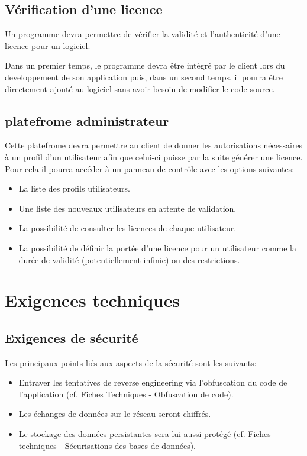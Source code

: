 \section{Vérification d'une licence}
Un programme devra permettre de vérifier la validité et l'authenticité d'une licence pour un logiciel. \newline

Dans un premier temps, le programme devra être intégré par le client lors du developpement de son application puis, dans un second temps, il pourra être directement ajouté au logiciel sans avoir besoin de modifier le code source.

\section{platefrome administrateur}
Cette platefrome devra permettre au client de donner les autorisations nécessaires à un profil d'un utilisateur afin que celui-ci puisse par la suite générer une licence.
Pour cela il pourra accéder à un panneau de contrôle avec les options suivantes:

\begin{itemize}
	\item La liste des profils utilisateurs.
	\item Une liste des nouveaux utilisateurs en attente de validation.
	\item La possibilité de consulter les licences de chaque utilisateur.
	\item La possibilité de définir la portée d'une licence pour un utilisateur comme la durée de validité (potentiellement infinie) ou des restrictions.
\end{itemize}
\newpage

\chapter{Exigences techniques}

\section{Exigences de sécurité}
Les principaux points liés aux aspects de la sécurité sont les suivants:
\begin{itemize}
	\item Entraver les tentatives de reverse engineering via l'obfuscation du code de l'application (cf. Fiches Techniques - Obfuscation de code).
	\item Les échanges de données sur le réseau seront chiffrés.
	\item Le stockage des données persistantes sera lui aussi protégé (cf. Fiches techniques - Sécurisations des bases de données).
\end{itemize}


